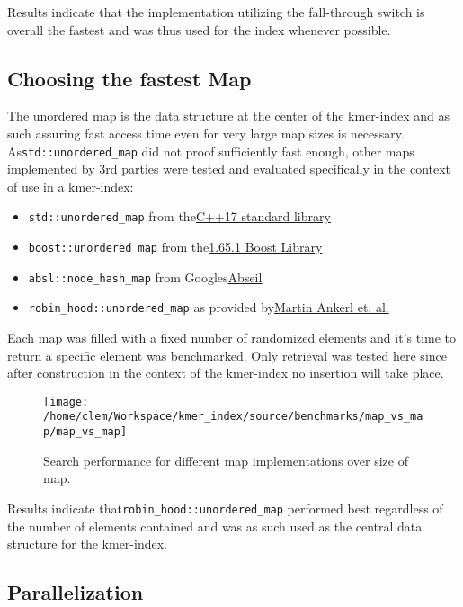 Results indicate that the implementation utilizing the fall-through
switch is overall the fastest and was thus used for the index whenever
possible.

\subsection{Choosing the fastest Map}

The unordered map is the data structure at the center of the kmer-index
and as such assuring fast access time even for very large map sizes
is necessary. As\lstinline{std::unordered_map} did not proof sufficiently
fast enough, other maps implemented by 3rd parties were tested and
evaluated specifically in the context of use in a kmer-index:
\begin{itemize}
\item \lstinline{std::unordered_map} from the\href{https://en.cppreference.com/w/cpp/container/unordered_map}{C++17 standard library}
\item \lstinline{boost::unordered_map} from the\href{https://www.boost.org/doc/libs/1_65_0/doc/html/boost/unordered_map.html}{1.65.1 Boost Library}
\item \lstinline{absl::node_hash_map} from Googles\href{https://abseil.io/docs/cpp/guides/container\#abslnode_hash_map-and-abslnode_hash_set}{Abseil}
\item \lstinline{robin_hood::unordered_map} as provided by\href{https://github.com/martinus/robin-hood-hashing}{Martin Ankerl et. al.}
\end{itemize}
Each map was filled with a fixed number of randomized elements and
it's time to return a specific element was benchmarked. Only retrieval
was tested here since after construction in the context of the kmer-index
no insertion will take place.

\begin{figure}[H]
\texttt{[image: /home/clem/Workspace/kmer\_index/source/benchmarks/map\_vs\_map/map\_vs\_map]}

\caption{Search performance for different map implementations over size of
map.}
\end{figure}

Results indicate that\lstinline{robin_hood::unordered_map} performed
best regardless of the number of elements contained and was as such
used as the central data structure for the kmer-index.

\subsection{Parallelization}


